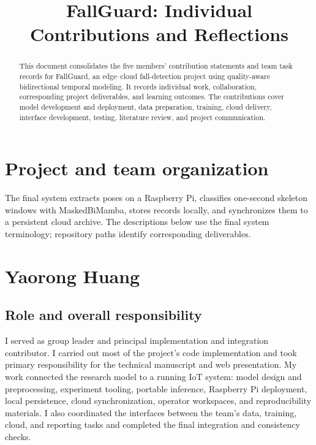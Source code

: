 \documentclass[conference,a4paper]{IEEEtran}
\begin{document}
\title{FallGuard: Individual Contributions and Reflections}
\author{
}
\maketitle

\begin{abstract}
This document consolidates the five members' contribution statements and team task records for FallGuard, an edge--cloud fall-detection project using quality-aware bidirectional temporal modeling. It records individual work, collaboration, corresponding project deliverables, and learning outcomes. The contributions cover model development and deployment, data preparation, training, cloud delivery, interface development, testing, literature review, and project communication.
\end{abstract}

\section{Project and team organization}

The final system extracts poses on a Raspberry Pi, classifies one-second skeleton windows with MaskedBiMamba, stores records locally, and synchronizes them to a persistent cloud archive. The descriptions below use the final system terminology; repository paths identify corresponding deliverables.

\section{Yaorong Huang}
\subsection{Role and overall responsibility}

I served as group leader and principal implementation and integration contributor. I carried out most of the project's code implementation and took primary responsibility for the technical manuscript and web presentation. My work connected the research model to a running IoT system: model design and preprocessing, experiment tooling, portable inference, Raspberry Pi deployment, local persistence, cloud synchronization, operator workspaces, and reproducibility materials. I also coordinated the interfaces between the team's data, training, cloud, and reporting tasks and completed the final integration and consistency checks.
\end{document}
